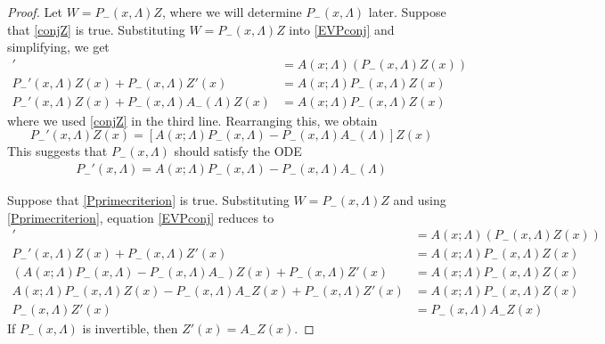 \documentclass[thesis.tex]{subfiles}
\begin{document}
\begin{lemma}
\begin{proof}
Let $W = P_-(x, \Lambda) Z$, where we will determine $P_-(x, \Lambda)$ later. Suppose that \cref{conjZ} is true. Substituting $W = P_-(x, \Lambda) Z$ into \eqref{EVPconj} and simplifying, we get
\begin{align*}
[P_-(x, \Lambda) Z(x)]' &= A(x; \Lambda)(P_-(x, \Lambda) Z(x)) \\
P_-'(x, \Lambda) Z(x) + P_-(x, \Lambda) Z'(x)
&= A(x; \Lambda)P_-(x, \Lambda) Z(x) \\
P_-'(x, \Lambda) Z(x) + P_-(x, \Lambda) A_-(\Lambda) Z(x)
&= A(x; \Lambda)P_-(x, \Lambda) Z(x)
\end{align*}
where we used \cref{conjZ} in the third line. Rearranging this, we obtain
\begin{equation*}
P_-'(x, \Lambda) Z(x)
= [A(x; \Lambda)P_-(x, \Lambda) - P_-(x, \Lambda) A_-(
\Lambda)]Z(x)
\end{equation*}
This suggests that $P_-(x, \Lambda)$ should satisfy the ODE
\begin{align}\label{Pprimecriterion}
P_-'(x, \Lambda) = A(x; \Lambda)P_-(x, \Lambda) - P_-(x, \Lambda) A_-(\Lambda)
\end{align}

Suppose that \cref{Pprimecriterion} is true. Substituting $W = P_-(x, \Lambda) Z$ and using \cref{Pprimecriterion}, equation \cref{EVPconj} reduces to
\begin{align*}
[P_-(x, \Lambda) Z(x)]' &= A(x; \Lambda)(P_-(x, \Lambda) Z(x)) \\
P_-'(x, \Lambda) Z(x) + P_-(x, \Lambda) Z'(x)
&= A(x; \Lambda)P_-(x, \Lambda) Z(x) \\
(A(x; \Lambda)P_-(x, \Lambda) - P_-(x, \Lambda) A_-)Z(x) + P_-(x, \Lambda) Z'(x)
&= A(x; \Lambda)P_-(x, \Lambda) Z(x) \\
A(x; \Lambda)P_-(x, \Lambda)Z(x) - P_-(x, \Lambda) A_- Z(x) + P_-(x, \Lambda) Z'(x)
&= A(x; \Lambda)P_-(x, \Lambda) Z(x) \\
P_-(x, \Lambda) Z'(x) &= P_-(x, \Lambda) A_- Z(x) 
\end{align*}
If $P_-(x, \Lambda)$ is invertible, then $Z'(x) = A_- Z(x)$.


\end{proof}
\end{lemma}
\end{document}
